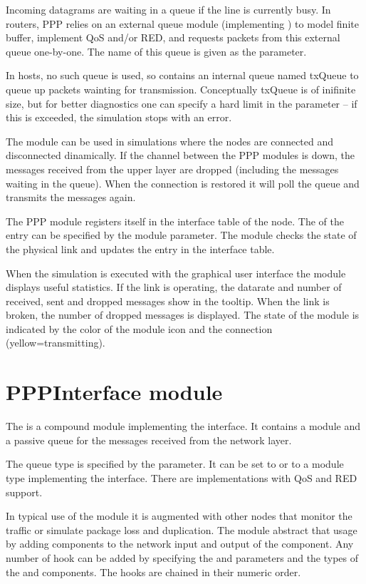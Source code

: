 Incoming datagrams are waiting in a queue if the line is currently busy.
In routers, PPP relies on an external queue module (implementing
) to model finite buffer, implement QoS and/or RED,
and requests packets from this external queue one-by-one. The name
of this queue is given as the  parameter.

In hosts, no such queue is used, so  contains an internal
queue named txQueue to queue up packets wainting for transmission.
Conceptually txQueue is of inifinite size, but for better diagnostics
one can specify a hard limit in the  parameter -- if
this is exceeded, the simulation stops with an error.

The module can be used in simulations where the nodes are connected and
disconnected dinamically. If the channel between the PPP modules is down,
the messages received from the upper layer are dropped (including the messages
waiting in the queue). When the connection is restored it will
poll the queue and transmits the messages again.

The PPP module registers itself in the interface table of the node.
The  of the entry can be specified by the
 module parameter. The module checks the state of the physical link
and updates the entry in the interface table.


When the simulation is executed with the graphical user interface
the module displays useful statistics. If the link is operating,
the datarate and number of received, sent and dropped messages
show in the tooltip. When the link is broken, the number of dropped
messages is displayed. The state of the module is indicated by the color
of the module icon and the connection (yellow=transmitting).

\section{PPPInterface module}

The  is a compound module implementing the 
interface. It contains a  module and a passive queue for the messages
received from the network layer.

The queue type is specified by the  parameter.
It can be set to  or to a module type implementing
the  interface. There are implementations
with QoS and RED support.

In typical use of the  module it is augmented with other nodes
that monitor the traffic or simulate package loss and duplication.
The  module abstract that usage by adding
 components to the network input and output of the
 component. Any number of hook can be added by
specifying the  and 
parameters and the types of the  and 
components. The hooks are chained in their numeric order.




